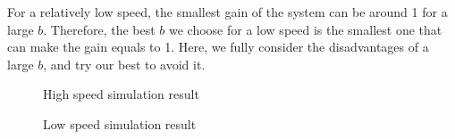 \documentclass{article}
\begin{document}
For a relatively low speed, the smallest gain of the system can be around 1 for a large $b$.
Therefore, the best $b$ we choose for a low speed is the smallest one that can make the gain equals to 1.
Here, we fully consider the disadvantages of a large $b$, and try our best to avoid it.\\

\begin{figure}[htbp]
    \centering
    \caption{High speed simulation result} 
\end{figure}

\begin{figure}[htbp]
    \centering
    \caption{Low speed simulation result}
\end{figure}
\end{document}
